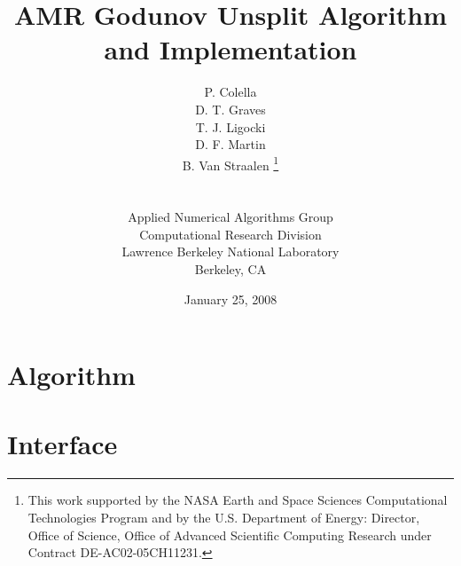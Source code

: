 \documentclass[12pt]{report}
\title{AMR Godunov Unsplit Algorithm and Implementation}
\author{P. Colella \\
        D. T. Graves \\ 
        T. J. Ligocki \\
        D. F. Martin \\
        B. Van Straalen \thanks{This work supported by the
        NASA Earth and Space Sciences Computational Technologies
        Program and by the U.S. Department of Energy: Director, Office
        of Science, Office of Advanced Scientific Computing Research
        under Contract DE-AC02-05CH11231. } \\
        \\ \\
Applied Numerical Algorithms Group \\
Computational Research Division \\
Lawrence Berkeley National Laboratory \\
Berkeley, CA}
\date{January 25, 2008}
\begin{document}
\maketitle

\tableofcontents

\chapter{Algorithm}


\chapter{Interface}



\end{document}
